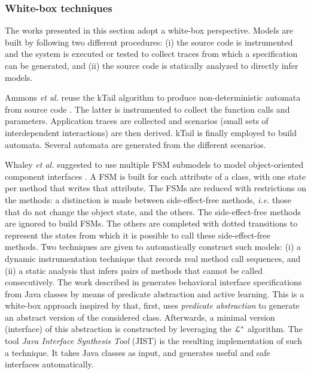 \subsubsection{White-box techniques}
\label{sec:passive-white}

The works presented in this section adopt a white-box
perspective. Models are built by following two different
procedures: (i) the source code is instrumented and the system is
executed or tested to collect traces from which a specification
can be generated, and (ii) the source code is statically analyzed
to directly infer models.

Ammons \emph{et al.} reuse the kTail algorithm to produce
non-deterministic automata from source code
\cite{Ammons:2002:MS:565816.503275}. The latter is instrumented
to collect the function calls and parameters.  Application traces
are collected and scenarios (small sets of interdependent
interactions) are then derived. kTail is finally employed to
build automata. Several automata are generated from the different
scenarios.

Whaley \emph{et al.} suggested to use multiple FSM submodels to model
object-oriented component interfaces
\cite{Whaley:2002:AEO:566171.566212}. A FSM is built for each
attribute of a class, with one state per method that writes that
attribute. The FSMs are reduced with restrictions on the methods:
a distinction is made between side-effect-free methods, \emph{i.e.} those
that do not change the object state, and the others. The
side-effect-free methods are ignored to build FSMs. The others are
completed with dotted transitions to represent the states
from which it is possible to call these side-effect-free methods.
Two techniques are given to automatically construct such models:
(i) a dynamic instrumentation technique that records real method call
sequences, and (ii) a static analysis that infers pairs of
methods that cannot be called consecutively. The work described
in \cite{Alur:2005:SIS:1047659.1040314} generates behavioral
interface specifications from Java classes by means of predicate
abstraction and active learning. This is a white-box approach
inspired by \cite{Whaley:2002:AEO:566171.566212} that, first,
uses \textit{predicate abstraction} to generate an abstract
version of the considered class. Afterwards, a minimal version
(interface) of this abstraction is constructed by leveraging the
$\EuScript{L}^*$ algorithm. The tool \textit{Java Interface
Synthesis Tool} (JIST) is the resulting implementation of such a
technique. It takes Java classes as input, and generates useful
and safe interfaces automatically.

